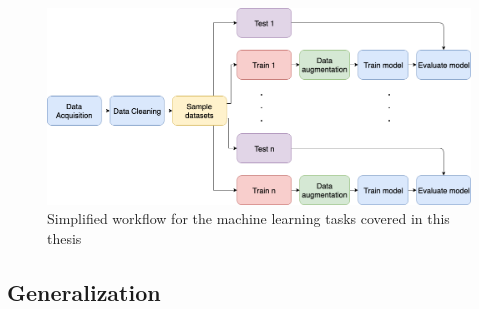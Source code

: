 \documentclass[11pt]{article}
\begin{document}
\begin{figure}[!h]
    \centering
    \includegraphics[scale = 0.4]{figurer/Introduction/data_flow_3.png}
    \caption{Simplified workflow for the machine learning tasks covered in this thesis}
    \label{fig:data_flow_2}
\end{figure}

\subsection{Generalization}
\end{document}

